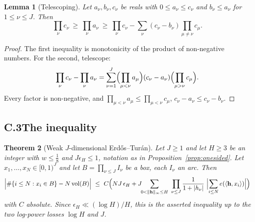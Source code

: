 \documentclass[11pt]{article}
\newtheorem{theorem}{Theorem}
\newtheorem{lemma}[theorem]{Lemma}
\theoremstyle{definition}
\theoremstyle{plain}
\begin{document}
\begin{lemma}[Telescoping]\label{lem:telescope}
Let $a_{\nu},b_{\nu},c_{\nu}$ be reals with $0\le a_{\nu}\le c_{\nu}$ and
$b_{\nu}\le a_{\nu}$ for $1\le\nu\le J$.  Then
\[
\prod_{\nu}c_{\nu}\ \ge\ \prod_{\nu}a_{\nu}
\ \ge\ \prod_{\nu}c_{\nu}-\sum_{\nu}(c_{\nu}-b_{\nu})
\prod_{\mu\ne\nu}c_{\mu}.
\]
\end{lemma}

\begin{proof}
The first inequality is monotonicity of the product of non-negative
numbers.  For the second, telescope:
\[
\prod_{\nu}c_{\nu}-\prod_{\nu}a_{\nu}
=\sum_{\nu=1}^{J}\Bigl(\prod_{\mu<\nu}a_{\mu}\Bigr)(c_{\nu}-a_{\nu})
\Bigl(\prod_{\mu>\nu}c_{\mu}\Bigr).
\]
Every factor is non-negative, and $\prod_{\mu<\nu}a_{\mu}\le
\prod_{\mu<\nu}c_{\mu}$, $c_{\nu}-a_{\nu}\le c_{\nu}-b_{\nu}$.
\end{proof}

\subsection*{C.3\quad The inequality}

\begin{theorem}[Weak $J$-dimensional Erd\H{o}s--Tur\'an]\label{thm:ET}
Let $J\ge1$ and let $H\ge3$ be an integer with $w\le\tfrac18$ and
$J\epsilon_{H}\le1$, notation as in
Proposition~\ref{prop:onesided}.  Let
$x_{1},\dots,x_{N}\in[0,1)^{J}$ and let
$B=\prod_{\nu\le J}I_{\nu}$ be a box, each $I_{\nu}$ an arc.  Then
\[
\Bigl|\#\{i\le N:x_{i}\in B\}-N\operatorname{vol}(B)\Bigr|
\ \le\ C\Bigl(N J\,\epsilon_{H}
+J\!\!\sum_{0<\|\mathbf h\|_{\infty}\le H}\ \prod_{\nu\le J}
\frac{1}{1+|h_{\nu}|}\ \Bigl|\sum_{i\le N}e(\langle\mathbf h,x_{i}\rangle)
\Bigr|\Bigr)
\]
with $C$ absolute.  Since $\epsilon_{H}\ll(\log H)/H$, this is the
asserted inequality up to the two log-power losses $\log H$ and $J$.
\end{theorem}
\end{document}
